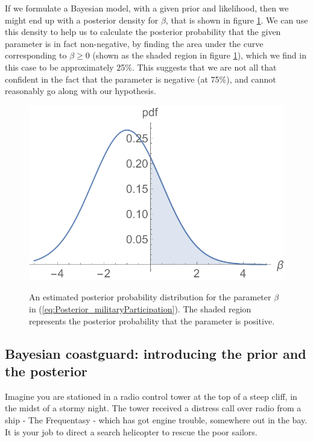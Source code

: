 \documentclass[11pt,fullpage]{book}
\begin{document}
If we formulate a Bayesian model, with a given prior and likelihood, then we might end up with a posterior density for $\beta$, that is shown in figure \ref{fig:Posterior_regressionMilitaryParticipation}. We can use this density to help us to calculate the posterior probability that the given parameter is in fact non-negative, by finding the area under the curve corresponding to $\beta\geq 0$ (shown as the shaded region in figure \ref{fig:Posterior_regressionMilitaryParticipation}), which we find in this case to be approximately 25\%. This suggests that we are not all that confident in the fact that the parameter is negative (at 75\%), and cannot reasonably go along with our hypothesis.

\begin{figure}
\centering
\scalebox{0.5} 
{\includegraphics{Posterior_regressionMilitaryParticipation.pdf}}
\caption{An estimated posterior probability distribution for the parameter $\beta$ in (\ref{eq:Posterior_militaryParticipation}). The shaded region represents the posterior probability that the parameter is positive.}\label{fig:Posterior_regressionMilitaryParticipation}
\end{figure}

\subsection{Bayesian coastguard: introducing the prior and the posterior}
Imagine you are stationed in a radio control tower at the top of a steep cliff, in the midst of a stormy night. The tower received a distress call over radio from a ship - The Frequentasy - which has got engine trouble, somewhere out in the bay. It is your job to direct a search helicopter to rescue the poor sailors.
\end{document}
